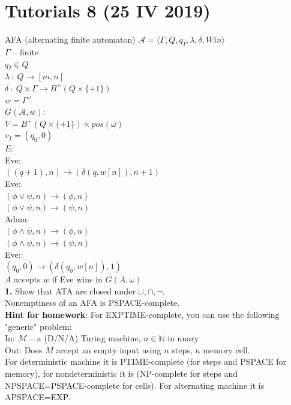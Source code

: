 \section{Tutorials 8 (25 IV 2019)}
AFA (alternating finite automaton) $\mathcal{A} = \langle \Gamma, Q, q_I, \lambda, \delta, Win \rangle$\\
$\Gamma$ -- finite\\
$q_I \in Q$\\
$\lambda\ :\ Q \rightarrow [m, n]$\\
$\delta\ :\ Q \times \Gamma \rightarrow B^{+}(Q \times \{+1\})$\\
$w = \Gamma^{\omega}$\\
$G(\mathcal{A}, w):$\\
$V = B^{+}(Q \times \{+1\}) \times pos(\omega)$\\
$v_I = (q_0, 0)$\\
$E:$\\
Eve:\\
$((q+1),n) \rightarrow (\delta(q, w[n]), n+1)$\\
Eve:\\
$(\phi \lor \psi, n) \rightarrow (\phi, n)$\\
$(\phi \lor \psi, n) \rightarrow (\psi, n)$\\
Adam:\\
$(\phi \land \psi, n) \rightarrow (\phi, n)$\\
$(\phi \land \psi, n) \rightarrow (\psi, n)$\\
Eve:\\
$(q_0, 0) \rightarrow (\delta(q_0, w[n]), 1)$\\

\noindent
$A$ accepts $w$ if Eve wins in $G(A, \omega)$\\

\noindent
\textbf{1.} Show that ATA are closed under $\cup, \cap, \lnot$.\\

\noindent
Nonemptiness of an AFA is PSPACE-complete.\\

\noindent
\textbf{Hint for homework}: For EXPTIME-complete, you can use the
following "generic" problem:\\
In: $\mathcal{M}$ -- a (D/N/A) Turing machine, $n \in \mathbb{N}$ in unary\\
Out: Does $M$ accept an empty input using $n$ steps, $n$ memory cell.\\
For deterministic machine it is PTIME-complete (for steps and PSPACE for memory),
for nondeterministic it is (NP-complete for steps and NPSPACE=PSPACE-complete for cells).
For alternating machine it is APSPACE=EXP.

